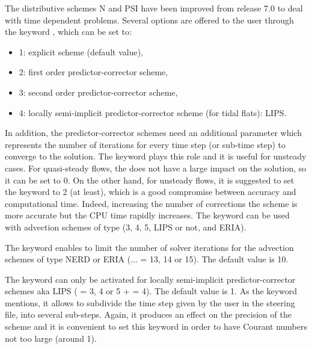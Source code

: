 The distributive schemes N and PSI have been improved from release 7.0 to deal
with time dependent problems. Several options are offered to the user through
the keyword , which can be set to:
\begin{itemize}
\item 1: explicit scheme (default value),
\item 2: first order predictor-corrector scheme,
\item 3: second order predictor-corrector scheme,
\item 4: locally semi-implicit predictor-corrector scheme
(for tidal flats): LIPS.
\end{itemize}
In addition, the predictor-corrector schemes need an additional parameter
which represents the number of iterations for every time step (or sub-time step)
to converge to the solution.
The keyword 
plays this role and it is useful for unsteady cases.
For quasi-steady flows, the
does not have a large impact on the solution, so it can be set to 0.
On the other hand, for unsteady flows, it is suggested to set the keyword
 to 2 (at least),
which is a good compromise between accuracy and computational time.
Indeed, increasing the number of corrections the scheme is more accurate
but the CPU time rapidly increases.
The keyword  can be used
with advection schemes of type (3, 4, 5, LIPS or not, and ERIA).

The keyword 
enables to limit the number of solver iterations for the advection schemes
of type NERD or ERIA (... = 13, 14 or 15).
The default value is 10.

The keyword  can only be
activated for locally semi-implicit predictor-corrector schemes aka LIPS
( = 3, 4 or 5
+  = 4).
The default value is 1.
As the keyword mentions, it allows to subdivide the time step given by the user
in the steering file, into several sub-steps.
Again, it produces an effect on the precision of the scheme and it is convenient
to set this keyword in order to have Courant numbers not too large (around 1).

